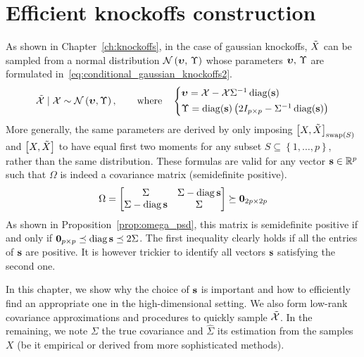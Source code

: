 \chapter{Efficient knockoffs construction}\label{ch:sdp}

As shown in Chapter~\ref{ch:knockoffs}, in the case of gaussian knockoffs,
$\tilde{X}$ can be sampled from a normal distribution $\mathcal{N}\left( \bm{\upsilon},\, \Upsilon \right)$ whose parameters
$\bm{\upsilon},\, \Upsilon$ are formulated in~\ref{eq:conditional_gaussian_knockoffs2}.
\begin{equation}\label{eq:conditional_gaussian_knockoffs2}
    \tcX \mid \cX \sim \cN\left( \bupsilon, \Upsilon \right)
    ,\qquad\text{where}\quad
    \begin{cases*}
        \bupsilon = \cX - \cX\Sigma^{-1}\diag(\bs)\\
        \Upsilon = \diag(\bs)\left( 2I_{p \times p} - \Sigma^{-1}\diag(\bs) \right)
    \end{cases*}
\end{equation}
More generally, the same parameters are derived by only imposing
$\big[ X, \tilde{X} \big]_{\operatorname{swap}\left( S \right)}$ and $\big[ X, \tilde{X} \big]$
to have equal first two moments
for any subset
$S \subseteq \left\{ 1, \dots, p \right\}$,
rather than the same distribution.
These formulas are valid for any vector $\mathbf{s} \in \mathbb{R}^p$ such that $\Omega$
is indeed a covariance matrix (semidefinite positive).
\begin{equation*}
    \Omega = \begin{bmatrix}
        \Sigma & \Sigma - \operatorname*{diag} \mathbf{s}\\
        \Sigma - \operatorname*{diag} \mathbf{s} & \Sigma
    \end{bmatrix}
    \succeq \mathbf{0}_{2p \times 2p}
\end{equation*}
As shown in Proposition~\ref{prop:omega_psd},
this matrix is semidefinite positive if and only if $\mathbf{0}_{p \times p} \preceq \operatorname*{diag} \mathbf{s} \preceq 2 \Sigma$.
The first inequality clearly holds if all the entries of $\mathbf{s}$ are positive.
It is however trickier to identify all vectors $\mathbf{s}$ satisfying the second one.

In this chapter, we show why the choice of $\mathbf{s}$ is important and how to efficiently find an appropriate one
in the high-dimensional setting.
We also form low-rank covariance approximations and procedures to quickly sample $\tilde{\mathcal{X}}$.
In the remaining, we note $\Sigma$ the true covariance and $\hat{\Sigma}$ its estimation from the samples $X$
(be it empirical or derived from more sophisticated methods).


